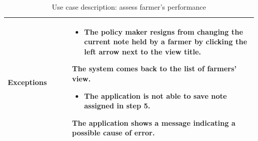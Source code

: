 \begin{table}[H]
\begin{tabular}{@{}p{0.25\linewidth} p{0.72\linewidth}@{}}
		\textbf{Exceptions}         & \begin{itemize}[leftmargin=.4cm,noitemsep,topsep=0pt,before=\vspace{-3mm}]
		   \item The policy maker resigns from changing the current note held by a farmer by clicking the left arrow next to the view title. 
		\end{itemize}
	    The system comes back to the list of farmers' view.
	    \begin{itemize}[leftmargin=.4cm,noitemsep,topsep=0pt]
		   \item The application is not able to save note assigned in step 5. 
		\end{itemize}
		The application shows a message indicating a possible cause of error.
		\\\bottomrule
	\end{tabular}
	\caption{Use case description: assess farmer's performance} 
\end{table}

